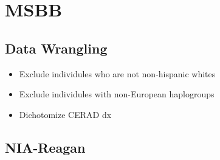 \documentclass[]{book}
\newenvironment{Shaded}{\begin{snugshade}}{\end{snugshade}}
\newcommand{\DataTypeTok}[1]{\textcolor[rgb]{0.13,0.29,0.53}{#1}}
\newcommand{\DecValTok}[1]{\textcolor[rgb]{0.00,0.00,0.81}{#1}}
\newcommand{\KeywordTok}[1]{\textcolor[rgb]{0.13,0.29,0.53}{\textbf{#1}}}
\newcommand{\NormalTok}[1]{#1}
\newcommand{\OperatorTok}[1]{\textcolor[rgb]{0.81,0.36,0.00}{\textbf{#1}}}
\newcommand{\StringTok}[1]{\textcolor[rgb]{0.31,0.60,0.02}{#1}}
\providecommand{\tightlist}{%
  \setlength{\itemsep}{0pt}\setlength{\parskip}{0pt}}
\begin{document}
\hypertarget{msbb-1}{%
\section{MSBB}\label{msbb-1}}

\hypertarget{data-wrangling-1}{%
\subsection{Data Wrangling}\label{data-wrangling-1}}

\begin{itemize}
\tightlist
\item
  Exclude individules who are not non-hispanic whites
\item
  Exclude individules with non-European haplogroups
\item
  Dichotomize CERAD dx
\end{itemize}

\begin{Shaded}
\end{Shaded}

\hypertarget{nia-reagan}{%
\subsection{NIA-Reagan}\label{nia-reagan}}
\end{document}
